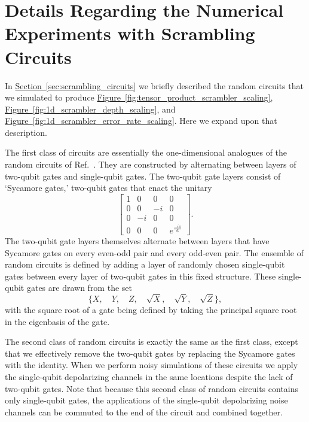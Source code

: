 \documentclass[
amsmath,
amssymb,
aps,
pra,
reprint,
twocolumn,
superscriptaddress,
longbibliography,
showkeys,
floatfix
]{revtex4-1}
\renewcommand{\sec}[1]{\hyperref[sec:#1]{Section~\ref*{sec:#1}}}
\newcommand{\fig}[1]{\hyperref[fig:#1]{Figure~\ref*{fig:#1}}}
\begin{document}
\section{Details Regarding the Numerical Experiments with Scrambling Circuits}
\label{app:scrambling_circuit_details}

In \sec{scrambling_circuits} we briefly described the random circuits that we
simulated to produce \fig{tensor_product_scrambler_scaling},
\fig{1d_scrambler_depth_scaling}, and \fig{1d_scrambler_error_rate_scaling}.
Here we expand upon that description.

The first class of circuits are essentially the one-dimensional analogues of the
random circuits of Ref.~.
They are constructed by alternating between layers of two-qubit gates and
single-qubit gates. 
The two-qubit gate layers consist of `Sycamore gates,' two-qubit gates that
enact the unitary
\begin{equation}
\begin{bmatrix}
  1  & 0  & 0  & 0 \\
  0  & 0  & -i  & 0 \\
  0  & -i  & 0  & 0 \\
  0 & 0 & 0 & e^{\frac{-i\pi}{6}}
\end{bmatrix}.
\end{equation}
The two-qubit gate layers themselves alternate between layers that have Sycamore
gates on every even-odd pair and every odd-even pair.
The ensemble of random circuits is defined by adding a layer of randomly chosen
single-qubit gates between every layer of two-qubit gates in this fixed
structure.
These single-qubit gates are drawn from the set
\begin{equation}
  \Big\{ X,\quad Y,\quad Z,\quad \sqrt{X},\quad \sqrt{Y},\quad \sqrt{Z} \Big\},
\end{equation}
with the square root of a gate being defined by taking the principal square root
in the eigenbasis of the gate.

The second class of random circuits is exactly the same as the first class,
except that we effectively remove the two-qubit gates by replacing the Sycamore
gates with the identity. 
When we perform noisy simulations of these circuits we apply the single-qubit
depolarizing channels in the same locations despite the lack of two-qubit gates. 
Note that because this second class of random circuits contains only
single-qubit gates, the applications of the single-qubit depolarizing noise
channels can be commuted to the end of the circuit and combined together.
\end{document}

